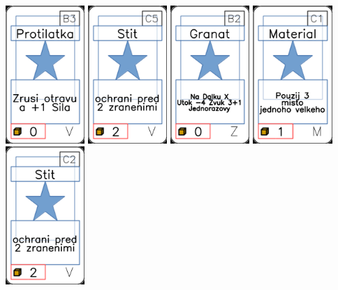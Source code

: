 \documentclass[a4paper]{article}
\begin{document}
	\includegraphics[width=3.0cm]{img-1_67}
	\includegraphics[width=3.0cm]{img-1_74}
	\includegraphics[width=3.0cm]{img-1_96}
	\includegraphics[width=3.0cm]{img-1_40}
	\includegraphics[width=3.0cm]{img-1_71}
\end{document}
